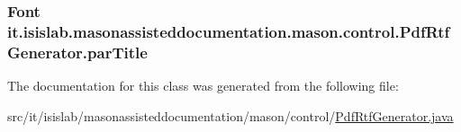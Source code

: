 \hypertarget{classit_1_1isislab_1_1masonassisteddocumentation_1_1mason_1_1control_1_1_pdf_rtf_generator_a3f130f576b5be4a3a82d7c59347c0869}{
\subsubsection[{par\-Title}]{\setlength{\rightskip}{0pt plus 5cm}Font it.\-isislab.\-masonassisteddocumentation.\-mason.\-control.\-Pdf\-Rtf\-Generator.\-par\-Title\hspace{0.3cm}{\ttfamily [private]}}}\label{classit_1_1isislab_1_1masonassisteddocumentation_1_1mason_1_1control_1_1_pdf_rtf_generator_a3f130f576b5be4a3a82d7c59347c0869}


The documentation for this class was generated from the following file\-:\begin{DoxyCompactItemize}
\item 
src/it/isislab/masonassisteddocumentation/mason/control/\hyperlink{_pdf_rtf_generator_8java}{Pdf\-Rtf\-Generator.\-java}\end{DoxyCompactItemize}
